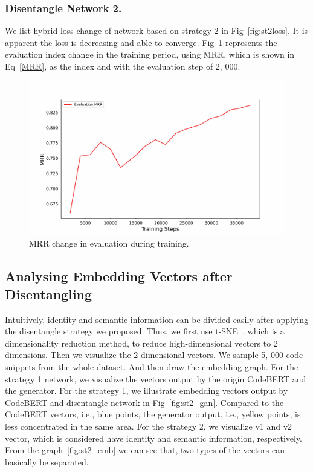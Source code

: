 \subsubsection{Disentangle Network 2.}
We list hybrid loss change of network based on strategy 2 in Fig~\ref{fig:st2loss}. 
It is apparent the loss is decreasing and able to converge. 
Fig~\ref{fig:st2eval} represents the evaluation index change in the training period, 
using MRR, which is shown in Eq~\ref{MRR}, as the index and with the evaluation step of 2, 000. 

\begin{figure}[htb]
	\centering
	\includegraphics[width=0.8\linewidth]{imgs/st2_eval.pdf}
	\caption{MRR change in evaluation during training.}
	\label{fig:st2eval}
\end{figure}

\subsection{Analysing Embedding Vectors after Disentangling}
Intuitively, identity and semantic information can be divided easily after 
applying the disentangle strategy we proposed. Thus, we first use t-SNE~\cite{tSNE}, 
which is a dimensionality reduction method, to 
reduce high-dimensional vectors to 2 dimensions. 
Then we visualize the 2-dimensional vectors. 
We sample 5, 000 code snippets from the whole dataset. 
And then draw the embedding graph. For the strategy 1 network, 
we visualize the vectors output by the origin CodeBERT and the generator. 
For the strategy 1, we illustrate embedding vectors output 
by CodeBERT and disentangle network in Fig~\ref{fig:st2_gan}. Compared to the CodeBERT vectors, i.e., 
blue points, the generator output, i.e., yellow points, 
is less concentrated in the same area. For the strategy 2, 
we visualize v1 and v2 vector, which is considered have identity and semantic information, 
respectively. From the graph~\ref{fig:st2_emb} we can see that, 
two types of the vectors can basically be separated. 

